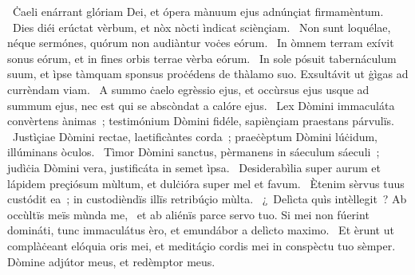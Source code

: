 ~Ċaeli enárrant glóriam Dei, et ópera mànuum ejus adnúnçiat firmamèntum. 
~Dies diéi erúctat vèrbum, et nòx nòcti ìndicat sciènçiam. 
~Non sunt loquélae, néque sermónes, quórum non audiàntur voċes eórum. 
~In òmnem terram exívit sonus eórum, et in fines orbis terrae vèrba eórum. 
~In sole pósuit tabernáculum suum, et ìpse tàmquam sponsus proċédens de thàlamo suo. Exsultávit ut ġìgas ad currèndam viam. 
~A summo ċaelo egrèssio ejus, et occùrsus ejus usque ad summum ejus, nec est qui se abscòndat a calóre ejus. 
~Lex Dòmini immaculáta convèrtens ànimas~; testimónium Dòmini fidéle, sapiènçiam praestans párvulïs. 
~Justìçiae Dòmini rectae, laetificàntes corda~; praeċèptum Dòmini lúċidum, illúminans òculos. 
~Tìmor Dòmini sanctus, pèrmanens in sáeculum sáeculi~; judìċia Dòmini vera, justificáta in semet ìpsa. 
~Desiderabìlia super aurum et lápidem preçiósum mùltum, et dulċióra super mel et favum. 
~Ètenim sèrvus tuus custódit ea~; in custodièndïs illïs retribúçio mùlta. 
~¿~Delìcta quìs intèllegit~? Ab occùltïs meïs mùnda me, 
~et ab aliénïs parce servo tuo. Si mei non fúerint domináti, tunc immaculátus èro, et emundábor a delìcto maximo. 
~Et èrunt ut complàċeant elóquia oris mei, et meditáçio cordis mei in conspèctu tuo sèmper. Dòmine adjútor meus, et redèmptor meus. 
